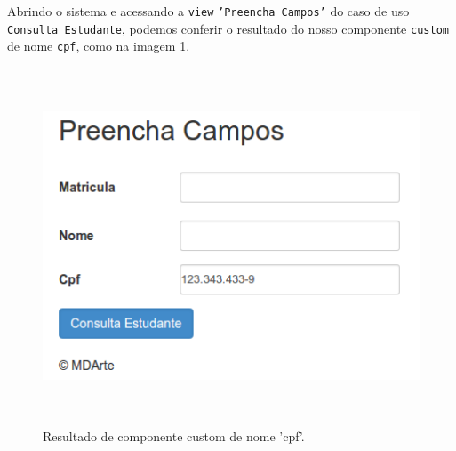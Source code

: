 Abrindo o sistema e acessando a \texttt{view} \texttt{'Preencha Campos'} do caso
de uso \texttt{Consulta Estudante}, podemos conferir o resultado do nosso
componente \texttt{custom} de nome \texttt{cpf}, como na imagem
\ref{parametro_cpf_custom_exemplo}.
\begin{figure}[H]
	\centering
	\includegraphics[width=350pt,height=300pt]{files/imgs/tutorial-mdarte-0035.png}
	\caption{Resultado de componente custom de nome 'cpf'.}
	\label{parametro_cpf_custom_exemplo}
\end{figure}